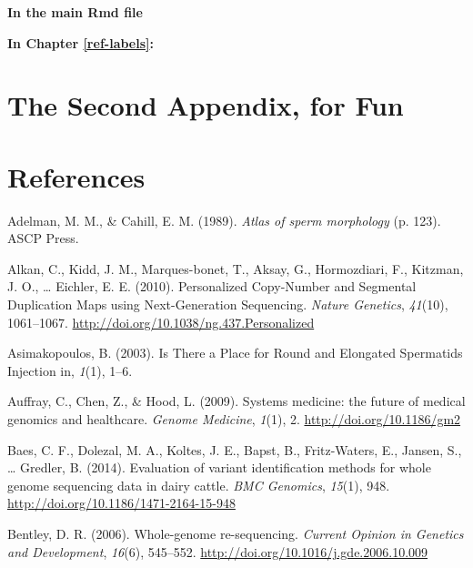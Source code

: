 \documentclass[12pt,twoside]{reedthesis}
\theoremstyle{definition}
\theoremstyle{definition}
\theoremstyle{remark}
\begin{document}
  \textbf{In the main Rmd file}
  
  \textbf{In Chapter \ref{ref-labels}:}
  
  \chapter{The Second Appendix, for
  Fun}\label{the-second-appendix-for-fun}
  
  \backmatter
  
  \chapter*{References}\label{references}
  
  \noindent
  
  \setlength{\parindent}{-0.20in} \setlength{\leftskip}{0.20in}
  \setlength{\parskip}{8pt}
  
  \hypertarget{refs}{}
  \hypertarget{ref-Adelman1989}{}
  Adelman, M. M., \& Cahill, E. M. (1989). \emph{Atlas of sperm
  morphology} (p. 123). ASCP Press.
  
  \hypertarget{ref-Alkan2010}{}
  Alkan, C., Kidd, J. M., Marques-bonet, T., Aksay, G., Hormozdiari, F.,
  Kitzman, J. O., \ldots{} Eichler, E. E. (2010). Personalized Copy-Number
  and Segmental Duplication Maps using Next-Generation Sequencing.
  \emph{Nature Genetics}, \emph{41}(10), 1061--1067.
  \url{http://doi.org/10.1038/ng.437.Personalized}
  
  \hypertarget{ref-Asimakopoulos2003}{}
  Asimakopoulos, B. (2003). Is There a Place for Round and Elongated
  Spermatids Injection in, \emph{1}(1), 1--6.
  
  \hypertarget{ref-Auffray2009}{}
  Auffray, C., Chen, Z., \& Hood, L. (2009). Systems medicine: the future
  of medical genomics and healthcare. \emph{Genome Medicine}, \emph{1}(1),
  2. \url{http://doi.org/10.1186/gm2}
  
  \hypertarget{ref-Baes2014}{}
  Baes, C. F., Dolezal, M. A., Koltes, J. E., Bapst, B., Fritz-Waters, E.,
  Jansen, S., \ldots{} Gredler, B. (2014). Evaluation of variant
  identification methods for whole genome sequencing data in dairy cattle.
  \emph{BMC Genomics}, \emph{15}(1), 948.
  \url{http://doi.org/10.1186/1471-2164-15-948}
  
  \hypertarget{ref-Bentley2006}{}
  Bentley, D. R. (2006). Whole-genome re-sequencing. \emph{Current Opinion
  in Genetics and Development}, \emph{16}(6), 545--552.
  \url{http://doi.org/10.1016/j.gde.2006.10.009}
  
\end{document}
